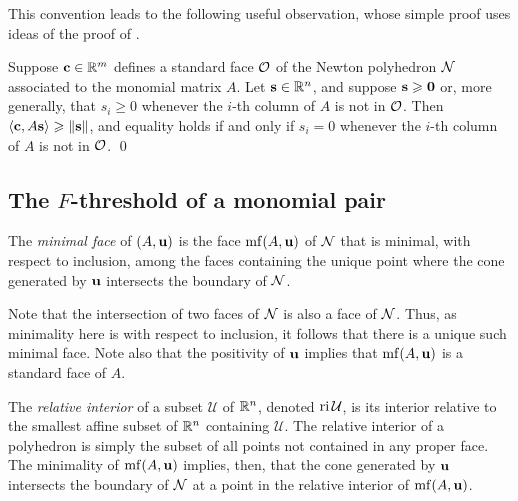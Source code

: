 \documentclass{amsart}
\begin{document}
This convention leads to the following useful observation, whose simple proof uses ideas of the proof of .

\begin{proposition}\label{prop: inner product with columns of A}
   Suppose $\mathbf{c} \in \mathbb{R}^m$ defines a standard face $\mathcal{O}$ of the Newton polyhedron $\mathcal{N}$ associated to the monomial matrix $A$.
   Let $\mathbf{s} \in \mathbb{R}^n$, and suppose $\mathbf{s} \geqslant \mathbf{0}$ or, more generally, that $s_i \ge 0$ whenever the $i$-th column of $A$ is not in $\mathcal{O}$.
   Then $\langle \mathbf{c}, A\mathbf{s} \rangle \geqslant \| \mathbf{s} \|$, and equality holds if and only if $s_i = 0$ whenever the $i$-th column of $A$ is not in $\mathcal{O}$.
   \qed
\end{proposition}



\subsection{The $F$-threshold of a monomial pair}

\begin{definition}
   The \emph{minimal face} of $(A, \mathbf{u})$ is the face $\operatorname{mf}(A, \mathbf{u})$ of $\mathcal{N}$ that is minimal, with respect to inclusion, among the faces containing the unique point where the cone generated by $\mathbf{u}$ intersects the boundary of $\mathcal{N}$.
\end{definition}

Note that the intersection of two faces of $\mathcal{N}$ is also a face of $\mathcal{N}$.
Thus, as minimality here is with respect to inclusion, it follows that there is a unique such minimal face.
Note also that the positivity of $\mathbf{u}$ implies that $\operatorname{mf}(A,\mathbf{u})$ is a standard face of $A$.

The \emph{relative interior} of a subset $\mathcal{U}$ of $\mathbb{R}^n$, denoted $\operatorname{ri} \mathcal{U}$, is its interior relative to the smallest affine subset of $\mathbb{R}^n$ containing $\mathcal{U}$.
The relative interior of a polyhedron is simply the subset of all points not contained in any proper face.
The minimality of $\operatorname{mf}(A,\mathbf{u})$ implies, then, that the cone generated by $\mathbf{u}$ intersects the boundary of $\mathcal{N}$ at a point in the relative interior of $\operatorname{mf}(A,\mathbf{u})$.
\end{document}
